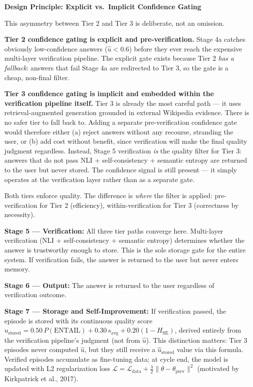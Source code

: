 \documentclass[12pt,a4paper]{article}
\theoremstyle{definition}
\newcommand{\uhat}{\hat{u}}
\newcommand{\ustored}{\hat{u}_{\text{stored}}}
\begin{document}
\begin{designbox}
\textbf{Design Principle: Explicit vs.\ Implicit Confidence Gating}

This asymmetry between Tier 2 and Tier 3 is deliberate, not an omission.

\textbf{Tier 2 confidence gating is explicit and pre-verification.} Stage 4a catches obviously low-confidence answers ($\uhat < 0.6$) before they ever reach the expensive multi-layer verification pipeline. The explicit gate exists because Tier 2 \emph{has a fallback}: answers that fail Stage 4a are redirected to Tier 3, so the gate is a cheap, non-final filter.

\textbf{Tier 3 confidence gating is implicit and embedded within the verification pipeline itself.} Tier 3 is already the most careful path — it uses retrieval-augmented generation grounded in external Wikipedia evidence. There is no safer tier to fall back to. Adding a separate pre-verification confidence gate would therefore either (a) reject answers without any recourse, stranding the user, or (b) add cost without benefit, since verification will make the final quality judgment regardless. Instead, Stage 5 verification \emph{is} the quality filter for Tier 3: answers that do not pass NLI + self-consistency + semantic entropy are returned to the user but never stored. The confidence signal is still present — it simply operates at the verification layer rather than as a separate gate.

Both tiers enforce quality. The difference is \emph{where} the filter is applied: pre-verification for Tier 2 (efficiency), within-verification for Tier 3 (correctness by necessity).
\end{designbox}

\textbf{Stage 5 — Verification:} All three tier paths converge here. Multi-layer verification (NLI + self-consistency + semantic entropy) determines whether the answer is trustworthy enough to store. This is the sole storage gate for the entire system. If verification fails, the answer is returned to the user but never enters memory.

\textbf{Stage 6 — Output:} The answer is returned to the user regardless of verification outcome.

\textbf{Stage 7 — Storage and Self-Improvement:} If verification passed, the episode is stored with its continuous quality score $\ustored = 0.50\,P(\text{ENTAIL}) + 0.30\,s_{\text{avg}} + 0.20(1{-}H_{\text{SE}})$, derived entirely from the verification pipeline's judgment (not from $\uhat$). This distinction matters: Tier 3 episodes never computed $\uhat$, but they still receive a $\ustored$ value via this formula. Verified episodes accumulate as fine-tuning data; at cycle end, the model is updated with L2 regularization loss $\mathcal{L} = \mathcal{L}_{\text{data}} + \frac{\lambda}{2}\|\theta - \theta_{\text{prev}}\|^2$ (motivated by Kirkpatrick et al., 2017).
\end{document}
